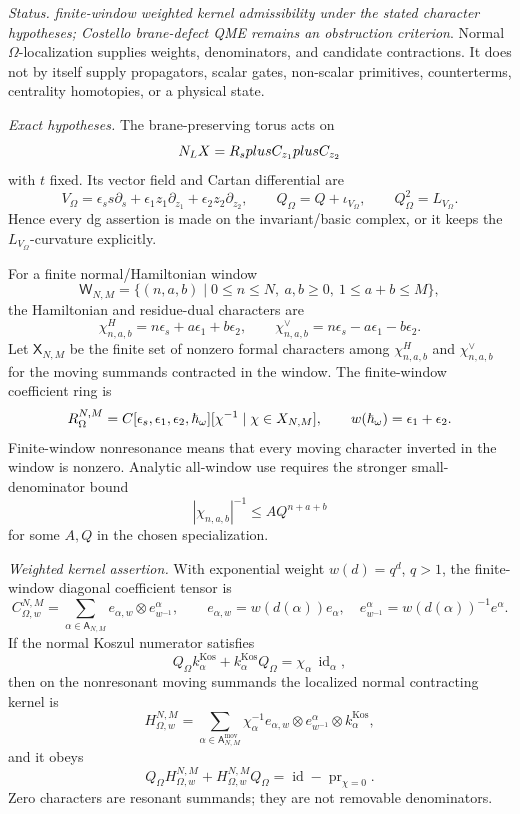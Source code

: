 \begin{stmt}\label{thm:lane-omega-weighted-kernel-qme-surface}
  \emph{Status.} \emph{finite-window weighted kernel admissibility under
  the stated character hypotheses; Costello brane-defect QME remains an
  obstruction criterion}.  Normal \(\Omega\)-localization supplies
  weights, denominators, and candidate contractions.  It does not by
  itself supply propagators, scalar gates, non-scalar primitives,
  counterterms, centrality homotopies, or a physical state.

  \emph{Exact hypotheses.} The brane-preserving torus acts on
  \[
    N_LX=R_splusC_{z_1}plusC_{z_2}
  \]
  with \(t\) fixed.  Its vector field and Cartan differential are
  \[
    V_\Omega=
    \epsilon_s s\partial_s+
    \epsilon_1z_1\partial_{z_1}+
    \epsilon_2z_2\partial_{z_2},
    \qquad
    Q_\Omega=Q+\iota_{V_\Omega},
    \qquad
    Q_\Omega^2=L_{V_\Omega}.
  \]
  Hence every dg assertion is made on the invariant/basic complex, or it
  keeps the \(L_{V_\Omega}\)-curvature explicitly.

  For a finite normal/Hamiltonian window
  \[
    \mathsf W_{N,M}
    =
    \{(n,a,b)\mid 0\le n\le N,\ a,b\ge0,\ 1\le a+b\le M\},
  \]
  the Hamiltonian and residue-dual characters are
  \[
    \chi^H_{n,a,b}=n\epsilon_s+a\epsilon_1+b\epsilon_2,
    \qquad
    \chi^\vee_{n,a,b}=n\epsilon_s-a\epsilon_1-b\epsilon_2 .
  \]
  Let \(\mathsf X_{N,M}\) be the finite set of nonzero formal characters
  among \(\chi^H_{n,a,b}\) and \(\chi^\vee_{n,a,b}\) for the moving
  summands contracted in the window.  The finite-window coefficient ring
  is
  \[
    R_{\Omega}^{N,M}
    =
    C[\epsilon_s,\epsilon_1,\epsilon_2,\hbar_\omega]
    [\chi^{-1}\mid \chi\in X_{N,M}],
    \qquad
    w(\hbar_\omega)=\epsilon_1+\epsilon_2 .
  \]
  Finite-window nonresonance means that every moving character inverted
  in the window is nonzero.  Analytic all-window use requires the
  stronger small-denominator bound
  \[
    |\chi_{n,a,b}|^{-1}\le A Q^{n+a+b}
  \]
  for some \(A,Q\) in the chosen specialization.

  \emph{Weighted kernel assertion.} With exponential weight \(w(d)=q^d\),
  \(q>1\), the finite-window diagonal coefficient tensor is
  \[
    C_{\Omega,w}^{N,M}
    =
    \sum_{\alpha\in\mathsf A_{N,M}}
    e_{\alpha,w}\otimes e^\alpha_{w^{-1}},
    \qquad
    e_{\alpha,w}=w(d(\alpha))e_\alpha,\quad
    e^\alpha_{w^{-1}}=w(d(\alpha))^{-1}e^\alpha.
  \]
  If the normal Koszul numerator satisfies
  \[
    Q_\Omega k^{\mathrm{Kos}}_\alpha+
    k^{\mathrm{Kos}}_\alpha Q_\Omega
    =
    \chi_\alpha\,\operatorname{id}_\alpha,
  \]
  then on the nonresonant moving summands the localized normal
  contracting kernel is
  \[
    H_{\Omega,w}^{N,M}
    =
    \sum_{\alpha\in\mathsf A^{\mathrm{mov}}_{N,M}}
    \chi_\alpha^{-1}
    e_{\alpha,w}\otimes e^\alpha_{w^{-1}}
    \otimes k^{\mathrm{Kos}}_\alpha,
  \]
  and it obeys
  \[
    Q_\Omega H_{\Omega,w}^{N,M}
    +H_{\Omega,w}^{N,M}Q_\Omega
    =
    \operatorname{id}-\operatorname{pr}_{\chi=0}.
  \]
  Zero characters are resonant summands; they are not removable
  denominators.


\end{stmt}
